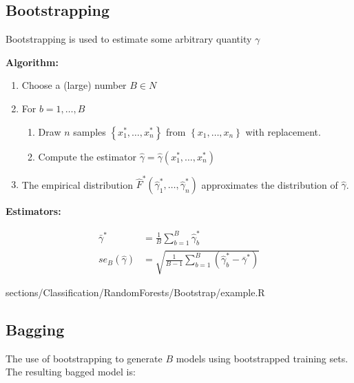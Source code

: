 \subsection{Bootstrapping}
 	\RTheory
 	{
 		Bootstrapping is used to estimate some arbitrary quantity $\gamma$
 		
 	    \textbf{Algorithm:}

		\begin{enumerate}
	    	\item Choose a (large) number $B \in N$
	    	\item For $b = 1,\dots,B$
	    		\begin{enumerate}
	    		    \item Draw $n$ samples $\left\{x_1^*,\dots,x_n^*\right\}$ from $\left\{x_1,\dots,x_n\right\}$ with replacement.
	    		    \item Compute the estimator $\hat{\gamma} = \hat{\gamma}(x_1^*,\dots,x_n^*)$
	    		\end{enumerate}
	    	\item The empirical distribution $\hat{F}^*(\hat{\gamma}_1^*,\dots,\hat{\gamma}_n^*)$ approximates the distribution of $\hat{\gamma}$.
		\end{enumerate}
		
		\textbf{Estimators:}
		
		$$\begin{aligned}
			\bar{\gamma}^* &= \frac{1}{B} \sum\limits_{b=1}^B \hat{\gamma}_b^*\\
			se_B(\hat{\gamma}) &= \sqrt{\frac{1}{B-1} \sum\limits_{b=1}^B (\hat{\gamma}_b^* - \bar{\gamma}^*)}
		\end{aligned}$$
	}
	{
		sections/Classification/RandomForests/Bootstrap/example.R
	}	
	
\subsection{Bagging}
	The use of bootstrapping to generate $B$ models using bootstrapped training sets. The resulting bagged model is:

